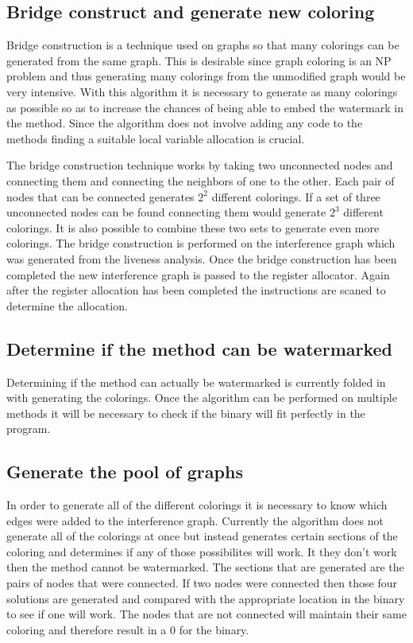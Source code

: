 \subsection{Bridge construct and generate new coloring}
Bridge construction is a technique used on graphs so that many colorings 
can be generated from the same graph. This is desirable since graph 
coloring is an NP problem and thus generating many colorings from the 
unmodified graph would be very intensive. With this algorithm it is 
necessary to generate as many colorings as possible so as to increase the 
chances of being able to embed the watermark in the method. Since the 
algorithm does not involve adding any code to the methods finding a 
suitable local variable allocation is crucial.

The bridge construction technique works by taking two unconnected nodes 
and connecting them and connecting the neighbors of one to the other. Each 
pair of nodes that can be connected generates $2^{2}$ different colorings. 
If a set of three unconnected nodes can be found connecting them would 
generate $2^{3}$ different colorings. It is also possible to combine these 
two sets to generate even more colorings. The bridge construction is 
performed on the interference graph which was generated from the liveness 
analysis. Once the bridge construction has been completed the new interference 
graph is passed to the register allocator. Again after the register 
allocation has been completed the instructions are scaned to determine the 
allocation.


\subsection{Determine if the method can be watermarked}
Determining if the method can actually be watermarked is currently folded 
in with generating the colorings. Once the algorithm can be performed on 
multiple methods it will be necessary to check if the binary will fit 
perfectly in the program.


\subsection{Generate the pool of graphs}
In order to generate all of the different colorings it is necessary to 
know which edges were added to the interference graph. Currently the 
algorithm does not generate all of the colorings at once but instead 
generates certain sections of the coloring and determines if any of those 
possibilites will work. It they don't work then the method cannot be 
watermarked. The sections that are generated are the pairs of nodes that were 
connected. If two nodes were connected then those four solutions are 
generated and compared with the appropriate location in the binary to see 
if one will work. The nodes that are not connected will maintain their 
same coloring and therefore result in a 0 for the binary.

